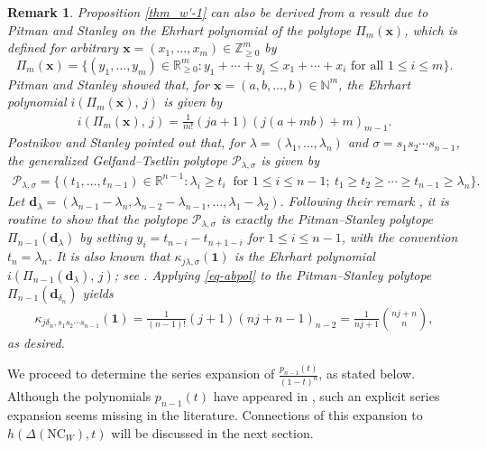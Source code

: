 \documentclass[12pt]{article}
\newtheorem{rem}[thm]{Remark}
\newcommand{\PP}{p}
\newcommand{\NC}{\mathrm{NC}}
\numberwithin{equation}{section}
\begin{document}
\begin{rem}\label{rem-PS-operator}
Proposition \ref{thm_w'-1} can also be derived from a result due to Pitman and Stanley \cite{Stanley-Pitman-2002} on the Ehrhart polynomial of the polytope $\Pi_m(\mathbf{x})$, which is defined for arbitrary $\mathbf{x}=(x_1,\ldots,x_m)\in\mathbb{Z}_{\geq 0}^m$ by
$$\Pi_m(\mathbf{x})=\{(y_1,\ldots,y_m)\in\mathbb{R}_{\geq 0}^m \colon y_1+\cdots+y_i\leq x_1+\cdots+x_i \mbox{ for all }1\leq i\leq m\}.$$
Pitman and Stanley \cite[Theorem~13]{Stanley-Pitman-2002} showed that, for $\mathbf{x}=(a,b,\ldots,b)\in \mathbb{N}^m$,   
the Ehrhart polynomial $i(\Pi_m(\mathbf{x}),\,j)$ is given by
\begin{align}\label{eq-abpol}
i(\Pi_m(\mathbf{x}),\,j)=\frac{1}{m!}(ja+1)(j(a+mb)+m)_{{m-1}}.
\end{align}
Postnikov and Stanley \cite[P.~172]{Postnikov-Stanley-2008} pointed out that, for $\lambda=(\lambda_1,\ldots,\lambda_n)$ and $\sigma=s_1s_2\cdots s_{n-1}$, the generalized Gelfand--Tsetlin polytope $\mathcal P_{\lambda,\sigma}$ is given by %
\begin{align*}
\mathcal P_{\lambda,\sigma}=\{(t_1,\ldots,t_{n-1})\in\mathbb R^{n-1}:\lambda_i\ge t_i\ \text{ for $1\leq i\leq n-1$};\ t_1\ge t_2\ge\cdots\ge t_{n-1}\ge \lambda_n\}.
\end{align*}
Let $\mathbf d_\lambda=(\lambda_{n-1}-\lambda_n,\lambda_{n-2}-\lambda_{n-1},\ldots,\lambda_1-\lambda_2)$.
Following their remark \cite[P.~135]{Postnikov-Stanley-2008}, it is routine to show that the polytope $\mathcal P_{\lambda,\sigma}$ is exactly the Pitman--Stanley polytope $\Pi_{n-1}(\mathbf d_\lambda)$ 
by setting $y_i=t_{n-i}-t_{n+1-i}$ for $1\le i\le n-1$, with the convention $t_n=\lambda_{n}$.
It is also known that 
$\kappa_{j\lambda,\sigma}(\mathbf 1)$ is the Ehrhart polynomial $i(\Pi_{n-1}(\mathbf d_\lambda),\,j)$; see \cite[Corollary~15.2]{Postnikov-Stanley-2008}. Applying \eqref{eq-abpol} to the Pitman--Stanley polytope $\Pi_{n-1}(\mathbf d_{\delta_n})$ yields
\begin{align*}
\kappa_{j\delta_n,s_1s_2\cdots s_{n-1}}(\mathbf1)=\frac{1}{(n-1)!}(j+1)(nj+n-1)_{n-2}=\frac{1}{nj+1}\binom{nj+n}{n},
\end{align*}
as desired.
\end{rem}

We proceed to determine the series expansion of $\frac{\PP_{n-1}(t)}{(1-t)^{n}}$, as stated below. 
Although the polynomials $\PP_{n-1}(t)$ have appeared in \cite{Athanasiadis-Douvropoulos-Kalampogia-Evangelinou-2024,Stanley-1997}, such an explicit series expansion seems missing in the literature. Connections of this expansion to $h(\Delta(\NC_W),t)$ will be discussed in the next section.  
\end{document}
